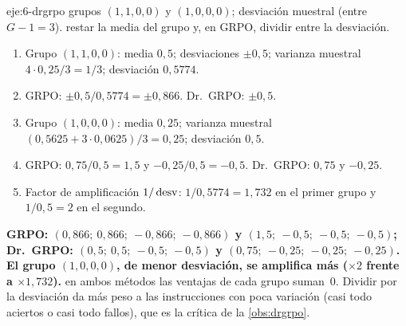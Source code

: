\begin{solucion}{eje:6-drgrpo}
\datos grupos $(1,1,0,0)$ y $(1,0,0,0)$; desviación muestral (entre $G-1=3$).
\planteamiento restar la media del grupo y, en GRPO, dividir entre la desviación.
\pasos
\begin{enumerate}[label=\arabic*.]
  \item Grupo $(1,1,0,0)$: media $0{,}5$; desviaciones $\pm 0{,}5$; varianza muestral $4\cdot 0{,}25/3=1/3$; desviación $0{,}5774$.
  \item GRPO: $\pm 0{,}5/0{,}5774=\pm 0{,}866$. Dr.~GRPO: $\pm 0{,}5$.
  \item Grupo $(1,0,0,0)$: media $0{,}25$; varianza muestral $(0{,}5625+3\cdot 0{,}0625)/3=0{,}25$; desviación $0{,}5$.
  \item GRPO: $0{,}75/0{,}5=1{,}5$ y $-0{,}25/0{,}5=-0{,}5$. Dr.~GRPO: $0{,}75$ y $-0{,}25$.
  \item Factor de amplificación $1/\operatorname{desv}$: $1/0{,}5774=1{,}732$ en el primer grupo y $1/0{,}5=2$ en el segundo.
\end{enumerate}
\resultado \textbf{GRPO: $(0{,}866;\ 0{,}866;\ -0{,}866;\ -0{,}866)$ y $(1{,}5;\ -0{,}5;\ -0{,}5;\ -0{,}5)$; Dr.~GRPO: $(0{,}5;\ 0{,}5;\ -0{,}5;\ -0{,}5)$ y $(0{,}75;\ -0{,}25;\ -0{,}25;\ -0{,}25)$. El grupo $(1,0,0,0)$, de menor desviación, se amplifica más ($\times 2$ frente a $\times 1{,}732$).}
\comprobacion en ambos métodos las ventajas de cada grupo suman~0. Dividir por la desviación da más peso a las instrucciones con poca variación (casi todo aciertos o casi todo fallos), que es la crítica de la \cref{obs:drgrpo}.
\end{solucion}


